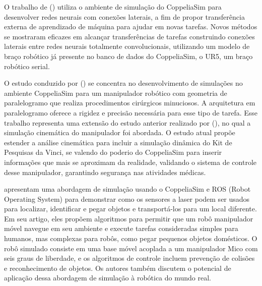 O trabalho de   (\citeyear{wang2023}) utiliza o ambiente de simulação do CoppeliaSim para desenvolver redes neurais com conexões laterais, a fim de propor transferência externa de aprendizado de máquina para ajudar em novas tarefas. Novos métodos se mostraram eficazes em alcançar transferências de tarefas construindo conexões laterais entre redes neurais totalmente convolucionais, utilizando um modelo de braço robótico já presente no banco de dados do CoppeliaSim, o UR5, um braço robótico serial.

O estudo conduzido por  (\citeyear{ferro2022}) se concentra no desenvolvimento de simulações no ambiente CoppeliaSim para um manipulador robótico com geometria de paralelogramo que realiza procedimentos cirúrgicos minuciosos. A arquitetura em paralelogramo oferece a rigidez e precisão necessária para esse tipo de tarefa. Esse trabalho representa uma extensão do estudo anterior realizado por   (\citeyear{fontanelli2018}), no qual a simulação cinemática do manipulador foi abordada. O estudo atual propõe estender a análise cinemática para incluir a simulação dinâmica do Kit de Pesquisas da Vinci, se valendo do poderio do CoppeliaSim para inserir informações que mais se aproximam da realidade, validando o sistema de controle desse manipulador, garantindo segurança nas atividades médicas.

 apresentam uma abordagem de simulação usando o CoppeliaSim e ROS (Robot Operating System) para demonstrar como os sensores a laser podem ser usados para localizar, identificar e pegar objetos e transportá-los para um local diferente. Em seu artigo, eles propõem algoritmos para permitir que um robô manipulador móvel navegue em seu ambiente e execute tarefas consideradas simples para humanos, mas complexas para robôs, como pegar pequenos objetos domésticos. O robô simulado consiste em uma base móvel acoplada a um manipulador Mico com seis graus de liberdade, e os algoritmos de controle incluem prevenção de colisões e reconhecimento de objetos. Os autores também discutem o potencial de aplicação dessa abordagem de simulação à robótica do mundo real.

